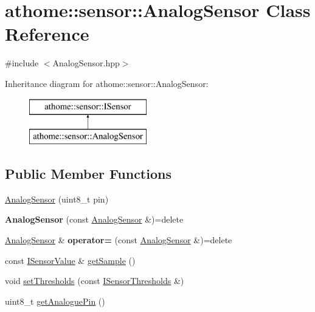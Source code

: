 \hypertarget{classathome_1_1sensor_1_1_analog_sensor}{}\section{athome\+:\+:sensor\+:\+:Analog\+Sensor Class Reference}
\label{classathome_1_1sensor_1_1_analog_sensor}


{\ttfamily \#include $<$Analog\+Sensor.\+hpp$>$}

Inheritance diagram for athome\+:\+:sensor\+:\+:Analog\+Sensor\+:\begin{figure}[H]
\begin{center}
\leavevmode
\includegraphics[height=2.000000cm]{classathome_1_1sensor_1_1_analog_sensor}
\end{center}
\end{figure}
\subsection*{Public Member Functions}
\begin{DoxyCompactItemize}
\item 
\mbox{\hyperlink{classathome_1_1sensor_1_1_analog_sensor_acd973b3cf9be02ca318eea594e8732d3}{Analog\+Sensor}} (uint8\+\_\+t pin)
\item 
\mbox{\label{classathome_1_1sensor_1_1_analog_sensor_a11abebcdb62ccd8fb7f10e4d1cc91516}} 
{\bfseries Analog\+Sensor} (const \mbox{\hyperlink{classathome_1_1sensor_1_1_analog_sensor}{Analog\+Sensor}} \&)=delete
\item 
\mbox{\label{classathome_1_1sensor_1_1_analog_sensor_a3e2cb67bd8eb58798d28eaf152f33b1a}} 
\mbox{\hyperlink{classathome_1_1sensor_1_1_analog_sensor}{Analog\+Sensor}} \& {\bfseries operator=} (const \mbox{\hyperlink{classathome_1_1sensor_1_1_analog_sensor}{Analog\+Sensor}} \&)=delete
\item 
const \mbox{\hyperlink{structathome_1_1sensor_1_1_i_sensor_1_1_i_sensor_value}{I\+Sensor\+Value}} \& \mbox{\hyperlink{classathome_1_1sensor_1_1_analog_sensor_a7ad00f985a9d1abeb64f973b5d16558c}{get\+Sample}} ()
\item 
void \mbox{\hyperlink{classathome_1_1sensor_1_1_analog_sensor_addcdb79aa03b7b6e386bc9c59faced10}{set\+Thresholds}} (const \mbox{\hyperlink{structathome_1_1sensor_1_1_i_sensor_1_1_i_sensor_thresholds}{I\+Sensor\+Thresholds}} \&)
\item 
uint8\+\_\+t \mbox{\hyperlink{classathome_1_1sensor_1_1_analog_sensor_ac4eab6ad6117e8e6689f9e1d9fb05015}{get\+Analogue\+Pin}} ()
\end{DoxyCompactItemize}
